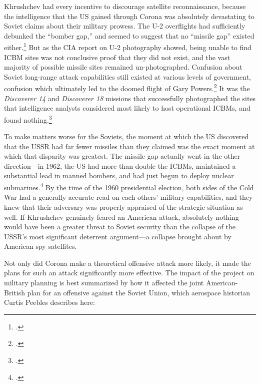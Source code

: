 \documentclass[14pt]{extarticle}
\begin{document}
Khrushchev had every incentive to discourage satellite reconnaissance, because the intelligence that the US gained through Corona was absolutely devastating to Soviet claims about their military prowess. The U-2 overflights had sufficiently debunked the ``bomber gap,'' and seemed to suggest that no ``missile gap'' existed either.\footcite{goodpaster_cold_2003} But as the CIA report on U-2 photography showed, being unable to find ICBM sites was not conclusive proof that they did not exist, and the vast majority of possible missile sites remained un-photographed. Confusion about Soviet long-range attack capabilities still existed at various levels of government, confusion which ultimately led to the doomed flight of Gary Powers.\footcite[p.~344]{brugioni_eyes_2010} It was the \emph{Discoverer 14} and \emph{Discoverer 18} missions that successfully photographed the sites that intelligence analysts considered most likely to host operational ICBMs, and found nothing.\footcite[p.~379]{brugioni_eyes_2010}

To make matters worse for the Soviets, the moment at which the US discovered that the USSR had far fewer missiles than they claimed was the exact moment at which that disparity was greatest. The missile gap actually went in the other direction---in 1962, the US had more than double the ICBMs, maintained a substantial lead in manned bombers, and had just begun to deploy nuclear submarines.\footcite[p.~251]{mcdougall_heavens_1985} By the time of the 1960 presidential election, both sides of the Cold War had a generally accurate read on each others' military capabilities, and they knew that their adversary was properly appraised of the strategic situation as well.  If Khrushchev genuinely feared an American attack, absolutely nothing would have been a greater threat to Soviet security than the collapse of the USSR's most significant deterrent argument---a collapse brought about by American spy satellites.

Not only did Corona make a theoretical offensive attack more likely, it made the plans for such an attack significantly more effective. The impact of the project on military planning is best summarized by how it affected the joint American-British plan for an offensive against the Soviet Union, which aerospace historian Curtis Peebles describes here:
\end{document}
